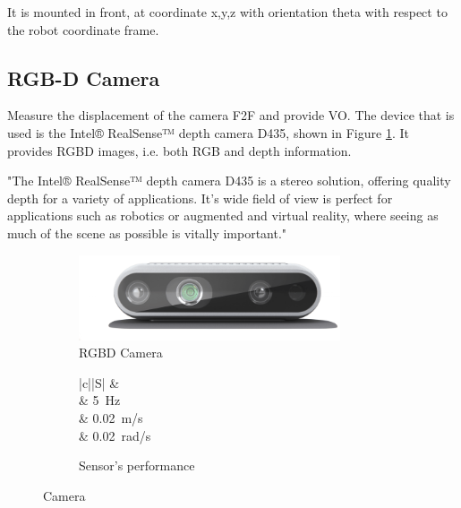 It is mounted in front, at coordinate x,y,z with orientation theta with respect to the robot coordinate frame.

\subsection{RGB-D Camera}

\noindent Measure the displacement of the camera \gls{F2F} and provide \gls{VO}.
The device that is used is the Intel® RealSense™ depth camera D435, shown in Figure \ref{fig:d435}.
It provides \gls{RGBD} images, i.e. both \gls{RGB} and depth information.

"The Intel® RealSense™ depth camera D435 is a stereo solution, offering quality depth for a variety of applications. It's wide field of view is perfect for applications such as robotics or augmented and virtual reality, where seeing as much of the scene as possible is vitally important."

\begin{figure}[!ht]
	\begin{center}
		\begin{subfigure}[b]{.5\textwidth}
			\begin{center}
				\includegraphics[width=0.85\textwidth]{Images/4-Methods/d435i-1.png}
			\end{center}
			\caption{\gls{RGBD} Camera}
			\label{fig:d435}
		\end{subfigure}
		\begin{subfigure}[b]{.45\textwidth}
			\begin{center}
				\label{tab:evalCamera}
				\begin{tabular}{|c||S|}
					\hline
					 &   \\
					\hline
					\hline
					 &  \SI{5}{Hz} \\
					\hline
					 & \SI{0.02}{\meter/\second} \\
					\hline
					\centering{$\boldsymbol \eta_{\omega}$} & \SI{0.02}{\radian/\second} \\
					\hline
				\end{tabular}
				\caption{Sensor's performance}
			\end{center}
		\end{subfigure}%
		\caption{Camera}
		\label{fig:camera_sensor}
	\end{center}
\end{figure}

